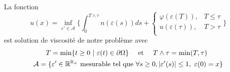 \begin{proposition}
    La fonction 
\begin{equation*}
    u(x)= \inf_{\varepsilon'\in \mathcal{A}}\biggl\{\int_{0}^{T\wedge \tau}n(\varepsilon(s))ds +
    \begin{cases}
        \varphi\left(\varepsilon\left(T\right)\right), &T\le \tau\\
        u\left(\varepsilon\left(\tau\right)\right), &T> \tau\\ 
    \end{cases}\biggl\}
\end{equation*}
est solution de viscosité de notre problème avec 
\begin{equation*}
    \begin{split}
        T=\min\{t\ge0\ |\ \varepsilon(t)\in \partial \Omega\} \quad& \text{ et } \quad T\wedge \tau=\min(T,\tau)\\
        \mathcal{A}= \{\varepsilon'\in\mathbb{R}^{\mathbb{R}_+}\text{ mesurable tel que }&\forall s\ge 0, |\varepsilon'(s)|\le 1, \ \varepsilon(0)=x\}
    \end{split}
\end{equation*}
\end{proposition}

